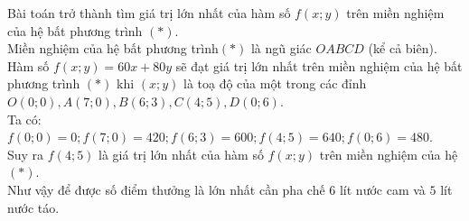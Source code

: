 \begin{bt}
{		Bài toán trở thành tìm giá trị lớn nhất của hàm số $ f(x;y) $ trên miền nghiệm của hệ bất phương
		trình $ (*)$.\\
		Miền nghiệm của hệ bất phương trình$  (*) $ là ngũ giác $ OABCD $ (kể cả biên).
		Hàm số $ f(x;y)=60x+80y $ sẽ đạt giá trị lớn nhất trên miền nghiệm của hệ bất phương trình $ (*) $ khi $ (x;y) $ là toạ độ của một trong các đỉnh $ O(0;0), A(7;0), B(6;3), C(4;5), D(0;6).$\\
		Ta có: $ f(0;0)=0; f(7;0)=420; f(6;3)=600; f(4;5)=640; f(0;6)=480. $\\
		Suy ra $ f(4;5) $ là giá trị lớn nhất của hàm số $ f(x;y) $ trên miền nghiệm của hệ $ (*).  $\\
		Như vậy để được số điểm thưởng là lớn nhất cần pha chế $ 6 $ lít nước cam và $ 5 $ lít nước táo.
	}
\end{bt}


